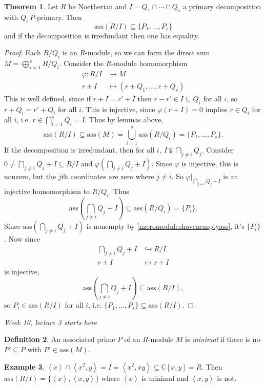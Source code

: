 \documentclass[a4paper]{article}
\newcommand{\la}{\left\langle}
\newcommand{\ra}{\right\rangle}
\newcommand{\C}{\mathbb C}
\newcommand{\ass}{\text{ass}}
\theoremstyle{definition}
\newtheorem{defn}{Definition}[subsection]
\newtheorem{thm}[defn]{Theorem}
\newtheorem{example}[defn]{Example}
\begin{document}
\begin{thm}
Let $R$ be Noetherian and $I=Q_1\cap\cdots\cap Q_s$ a primary decomposition with $Q_i \ P$-primary. Then
\[
\ass(R/I)\subseteq \{P_1,\ldots,P_s\}
\]
and if the decomposition is irredundant then one has equality.
\end{thm}

\begin{proof}
Each $R/Q_i$ is an $R$-module, so we can form the direct sum $M=\bigoplus_{i=1}^s R/Q_i$. Consider the $R$-module homomorphism
\[
\begin{aligned}
\varphi:R/I&\rightarrow M\\
r+I&\mapsto (r+Q_1,\ldots,r+Q_s)
\end{aligned}
\]
This is well defined, since if $r+I=r'+I$ then $r-r'\in I\subseteq Q_i$ for all $i$, so $r+Q_i=r'+Q_i$ for all $i$. This is injective, since $\varphi(r+I)=0$ implies $r\in Q_i$ for all $i$, i.e. $r\in\bigcap_{i=1}^s Q_i=I$. Thus by lemmas above,
\[
\ass(R/I)\subseteq\ass(M)=\bigcup_{i=1}^s \ass (R/Q_i)=\{P_1,\ldots,P_s\}.
\]
If the decomposition is irredundant, then for all $i,\ I\subsetneqq \bigcap_{j\neq i}Q_j$. Consider $0\neq \bigcap_{j\neq i} Q_j+I\subseteq R/I$ and $\varphi\left(\bigcap_{j\neq i} Q_j+I\right)$. Since $\varphi$ is injective, this is nonzero, but the $j$th coordinates are zero where $j\neq i$. So $\varphi|_{\bigcap_{j\neq i} Q_j+I}$ is an injective homomorphism to $R/Q_i$. Thus
\[
\ass\left(\bigcap_{j\neq i} Q_j+I\right)\subseteq \ass (R/Q_i)=\{P_i\}.
\]
Since $\ass\left(\bigcap_{j\neq i} Q_j+I\right)$ is nonempty by \ref{nzeromoduleshavenemptyass}, it's $\{P_i\}$. Now since
\[
\begin{aligned}
\bigcap_{j\neq i} Q_j+I&\hookrightarrow R/I\\
r+I&\mapsto r+I
\end{aligned}
\]
is injective,
\[
\ass\left(\bigcap_{j\neq i} Q_j+I\right)\subseteq \ass(R/I),
\]
so $P_i\in\ass(R/I)$ for all $i$, i.e. $\{P_1,\ldots,P_s\}\subseteq \ass(R/I)$.
\end{proof}

\begin{flushright}
\textit{Week 10, lecture 3 starts here}
\end{flushright}

\begin{defn}
An associated prime $P$ of an $R$-module $M$ is \textit{minimal} if there is no $P'\subseteq P$ with $P'\in\ass(M)$.
\end{defn}
\begin{example}
$\la x\ra\cap \la x^2,y\ra =I=\la x^2,xy\ra \subseteq \C[x,y]=R$. Then $\ass(R/I)=\{\la x\ra,\la x,y\ra\}$ where $\la x\ra$ is minimal and $\la x,y\ra$ is not.
\end{example}
\end{document}
